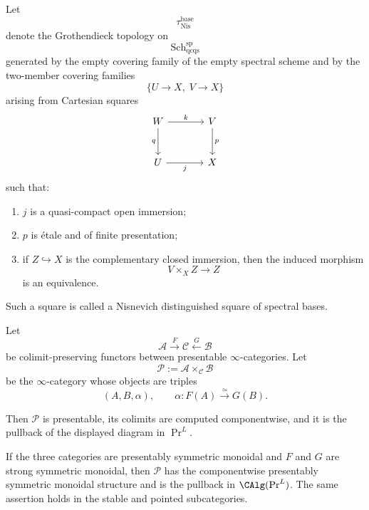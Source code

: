 \begin{definition}
\label{def:base-Nisnevich-topology}
Let
\[
    \tau_{\mathrm{Nis}}^{\mathrm{base}}
\]
denote the Grothendieck topology on
\[
    \operatorname{Sch}^{\mathrm{sp}}_{\mathrm{qcqs}}
\]
generated by the empty covering family of the empty spectral scheme and by
the two-member covering families
\[
    \{U\longrightarrow X,\;V\longrightarrow X\}
\]
arising from Cartesian squares
\[
\begin{tikzcd}[column sep=large,row sep=large]
    W \arrow[r,"k"] \arrow[d,"q"']
        & V \arrow[d,"p"] \\
    U \arrow[r,"j"']
        & X
\end{tikzcd}
\]
such that:
\begin{enumerate}
    \item \(j\) is a quasi-compact open immersion;
    \item \(p\) is \'{e}tale and of finite presentation;
    \item if \(Z\hookrightarrow X\) is the complementary closed immersion,
    then the induced morphism
    \[
        V\times_X Z\longrightarrow Z
    \]
    is an equivalence.
\end{enumerate}
Such a square is called a Nisnevich distinguished square of spectral bases.
\end{definition}

\begin{lemma}
\label{lem:presentable-category-pullback}
Let
\[
    \mathcal A
    \xrightarrow{F}
    \mathcal C
    \xleftarrow{G}
    \mathcal B
\]
be colimit-preserving functors between presentable
\(\infty\)-categories.  Let
\[
    \mathcal P
    :=
    \mathcal A
    \times_{\mathcal C}
    \mathcal B
\]
be the \(\infty\)-category whose objects are triples
\[
    (A,B,\alpha),
    \qquad
    \alpha:F(A)\xrightarrow{\simeq}G(B).
\]

Then \(\mathcal P\) is presentable, its colimits are computed componentwise,
and it is the pullback of the displayed diagram in \(\Pr^L\).

If the three categories are presentably symmetric monoidal and \(F\) and
\(G\) are strong symmetric monoidal, then \(\mathcal P\) has the
componentwise presentably symmetric monoidal structure and is the pullback in
\(\CAlg(\Pr^L)\).  The same assertion holds in the stable and pointed
subcategories.
\end{lemma}

